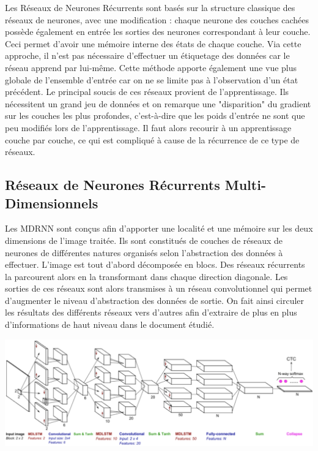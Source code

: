 Les Réseaux de Neurones Récurrents sont basés sur la structure classique des réseaux de neurones,
avec une modification : chaque neurone des couches cachées possède également en entrée les sorties
des neurones correspondant à leur couche. Ceci permet d'avoir une mémoire interne des états de chaque couche.
Via cette approche, il n'est pas nécessaire d'effectuer un étiquetage des données car le réseau apprend
par lui-même. Cette méthode apporte également une vue plus globale de l'ensemble d'entrée car on ne se limite
pas à l'observation d'un état précédent. Le principal soucis de ces réseaux provient de l'apprentissage.
Ils nécessitent un grand jeu de données et on remarque une "disparition" du gradient sur les couches les plus
profondes, c'est-à-dire que les poids d'entrée ne sont que peu modifiés lors de l'apprentissage. Il faut alors
recourir à un apprentissage couche par couche, ce qui est compliqué à cause de la récurrence de ce type de réseaux.

\subsection{Réseaux de Neurones Récurrents Multi-Dimensionnels}

Les MDRNN sont conçus afin d'apporter une localité et une mémoire sur les deux dimensions de l'image traitée.
Ils sont constitués de couches de réseaux de neurones de différentes natures organisés selon l'abstraction des
données à effectuer. L'image est tout d'abord décomposée en blocs. Des réseaux récurrents la parcourent alors
en la transformant dans chaque direction diagonale. Les sorties de ces réseaux sont alors transmises à un
réseau convolutionnel qui permet d'augmenter le niveau d'abstraction des données de sortie. On fait ainsi
circuler les résultats des différents réseaux vers d’autres afin d’extraire de plus en plus d’informations
de haut niveau dans le document étudié.

\begin{mdframed}[frametitle={Schéma de structure d'un MDRNN}, innerbottommargin=10]
\begin{center}
\includegraphics[width=0.6\linewidth]{mdrnn.png}
\end{center}
\end{mdframed}

